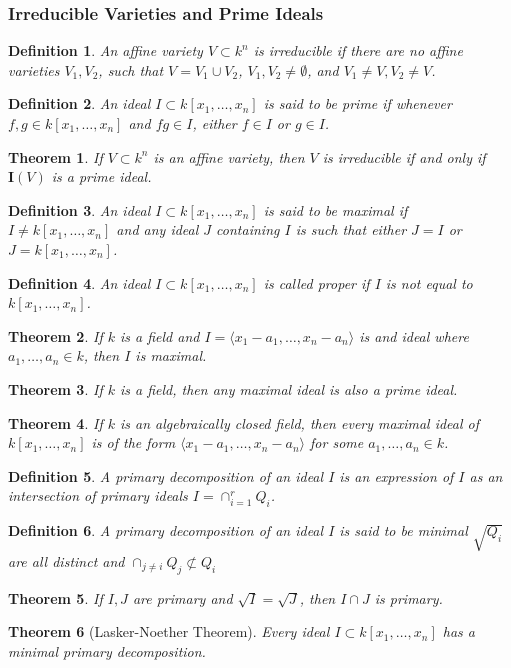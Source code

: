 \documentclass{article}
\theoremstyle{mystyle}
\newtheorem{theorem}{Theorem}[section]
\newtheorem{definition}{Definition}[section]
\begin{document}
\subsubsection{Irreducible Varieties and Prime Ideals}
\begin{definition}
An affine variety $V\subset k^n$ is irreducible if there are no affine varieties $V_1, V_2$, such that $V = V_1\cup V_2$, $V_1,V_2\ne \emptyset$, and $V_1 \ne V, V_2 \ne V$.
\end{definition}
\begin{definition}
An ideal $I\subset k[x_1,\hdots ,x_n]$ is said to be prime if whenever $f,g\in k[x_1,\hdots ,x_n]$ and $fg\in I$, either $f\in I$ or $g\in I$.
\end{definition}
\begin{theorem}
If $V\subset k^n$ is an affine variety, then $V$ is irreducible if and only if $\textbf{I}(V)$ is a prime ideal.
\end{theorem}
\begin{definition}
An ideal $I\subset k[x_1,\hdots ,x_n]$ is said to be maximal if $I \ne k[x_1,\hdots ,x_n]$ and any ideal $J$ containing $I$ is such that either $J = I$ or $J = k[x_1,\hdots ,x_n]$.
\end{definition}
\begin{definition}
An ideal $I\subset k[x_1,\hdots ,x_n]$ is called proper if $I$ is not equal to $k[x_1,\hdots ,x_n]$.
\end{definition}
\begin{theorem}
If $k$ is a field and $I = \langle x_1-a_1,\hdots, x_n-a_n\rangle$ is and ideal where $a_1,\hdots, a_n \in k$, then $I$ is maximal.
\end{theorem}
\begin{theorem}
If $k$ is a field, then any maximal ideal is also a prime ideal.
\end{theorem}
\begin{theorem}
If $k$ is an algebraically closed field, then every maximal ideal of $k[x_1,\hdots ,x_n]$ is of the form $\langle x_1-a_1,\hdots, x_n-a_n\rangle$ for some $a_1,\hdots, a_n\in k$.
\end{theorem}
\begin{definition}
A primary decomposition of an ideal $I$ is an expression of $I$ as an intersection of primary ideals $I = \cap_{i=1}^{r} Q_{i}$.
\end{definition}
\begin{definition}
A primary decomposition of an ideal $I$ is said to be minimal $\sqrt{Q_i}$ are all distinct and $\cap_{j\ne i}Q_j \not \subset Q_i$
\end{definition}
\begin{theorem}
If $I,J$ are primary and $\sqrt{I}=\sqrt{J}$, then $I\cap J$ is primary.
\end{theorem}
\begin{theorem}[Lasker-Noether Theorem]
Every ideal $I \subset k[x_1,\hdots ,x_n]$ has a minimal primary decomposition.
\end{theorem}
\end{document}
